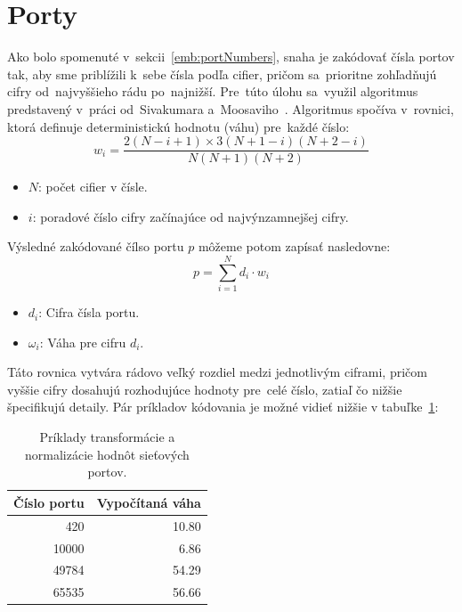 \section{Porty}
Ako bolo spomenuté v~sekcii~\ref{emb:portNumbers}, snaha je zakódovať čísla portov tak, aby sme priblížili k~sebe čísla podľa cifier, pričom sa~prioritne zohľadňujú cifry od~najvyššieho rádu po~najnižší. Pre~túto úlohu sa~využil algoritmus predstavený v~práci od~Sivakumara a~Moosaviho~\cite{port_embedding}. Algoritmus spočíva v~rovnici, ktorá definuje deterministickú hodnotu (váhu) pre~každé číslo:
\begin{equation}\label{emb:port_embedding}
    w_i = {\frac{2(N - i + 1) \times 3(N + 1 - i)(N + 2 - i)}{N(N + 1)(N + 2)}}
\end{equation}
\begin{itemize}
    \item $N$: počet cifier v čísle.
    \item $i$: poradové číslo cifry začínajúce od najvýnzamnejšej cifry.
\end{itemize}
Výsledné zakódované čílso portu $p$ môžeme potom zapísať nasledovne:
\begin{equation}
    p = \sum_{i=1}^N{d_i \cdot w_i}
\end{equation}
\begin{itemize}
    \item $d_i$: Cifra čísla portu.
    \item $\omega_i$: Váha pre cifru $d_i$.
\end{itemize}
    
Táto rovnica vytvára rádovo veľký rozdiel medzi jednotlivým ciframi, pričom vyššie cifry dosahujú rozhodujúce hodnoty pre~celé číslo, zatiaľ čo nižšie špecifikujú detaily. Pár príkladov kódovania je možné vidieť nižšie v tabuľke~\ref{tab:port_embedding_examples}:
\begin{table}[H]
    \centering
    \caption{Príklady transformácie a normalizácie hodnôt sieťových portov.}
    \label{tab:port_embedding_examples}
    \begin{tabular}{@{}rr@{}}
        \toprule
        \textbf{Číslo portu} & \textbf{Vypočítaná váha}  \\ \midrule
        420                  & 10.80                     \\
        10000               & 6.86                      \\
        49784               & 54.29                     \\
        65535               & 56.66                     \\ \bottomrule
    \end{tabular}
\end{table}

